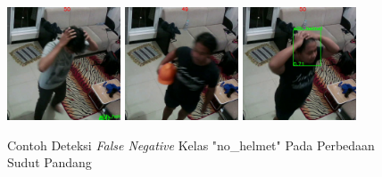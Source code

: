 \begin{figure} [h]
    \centering
    \includegraphics[width=0.3\textwidth]{gambar/analisis_gambar/semua_salah_FNno/test1_cctv_pred (6).png}
    \includegraphics[width=0.3\textwidth]{gambar/analisis_gambar/semua_salah_FNno/test2_cctv_pred (18).png}
    \includegraphics[width=0.3\textwidth]{gambar/analisis_gambar/semua_salah_FNno/test2_cctv_pred (4).png}
    \caption{Contoh Deteksi \emph{False Negative} Kelas "no\_helmet" Pada Perbedaan Sudut Pandang}
    \label{fig:example_fn_nohelm_all}
\end{figure}